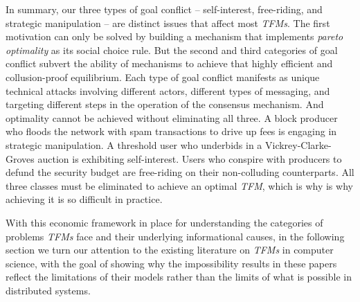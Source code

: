 In summary, our three types of goal conflict -- self-interest, free-riding, and strategic manipulation -- are distinct issues that affect most \textit{TFMs}. The first motivation can only be solved by building a mechanism that implements \textit{pareto optimality} as its social choice rule. But the second and third categories of goal conflict subvert the ability of mechanisms to achieve that highly efficient and collusion-proof equilibrium. Each type of goal conflict manifests as unique technical attacks involving different actors, different types of messaging, and targeting different steps in the operation of the consensus mechanism. And optimality cannot be achieved without eliminating all three. A block producer who floods the network with spam transactions to drive up fees is engaging in strategic manipulation. A threshold user who underbids in a Vickrey-Clarke-Groves auction is exhibiting self-interest. Users who conspire with producers to defund the security budget are free-riding on their non-colluding counterparts. All three classes must be eliminated to achieve an optimal \textit{TFM}, which is why is why achieving it is so difficult in practice.

With this economic framework in place for understanding the categories of problems \textit{TFMs} face and their underlying informational causes, in the following section we turn our attention to the existing literature on \textit{TFMs} in computer science, with the goal of showing why the impossibility results in these papers reflect the limitations of their models rather than the limits of what is possible in distributed systems.

